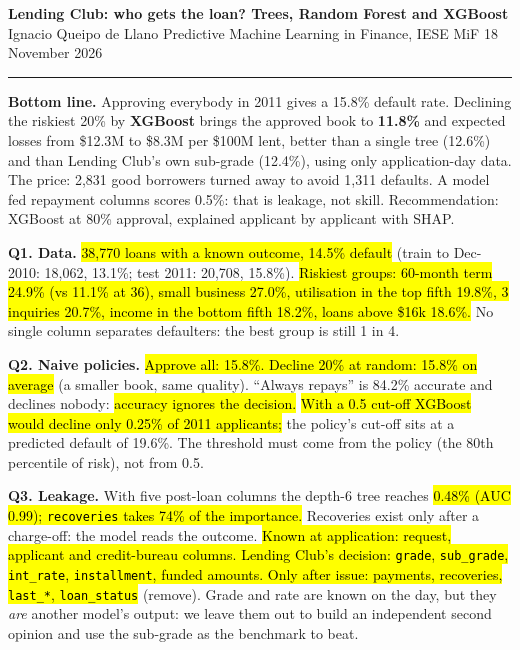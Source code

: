 \documentclass[10pt,a4paper]{article}
\newcommand{\q}[1]{\textbf{\color{blue!50!black}#1}}
\begin{document}
\small

{\large\textbf{Lending Club: who gets the loan? Trees, Random Forest and XGBoost}}\\
Ignacio Queipo de Llano \textperiodcentered{} Predictive Machine Learning in Finance, IESE MiF \textperiodcentered{} 18 November 2026\\[-6pt]
\rule{\linewidth}{0.4pt}

\begin{tcolorbox}[colback=white,colframe=black,boxrule=0.4pt,sharp corners,left=5pt,right=5pt,top=3pt,bottom=3pt]
\textbf{Bottom line.} Approving everybody in 2011 gives a 15.8\% default rate. Declining the riskiest 20\% by
\textbf{XGBoost} brings the approved book to \textbf{11.8\%} and expected losses from \$12.3M to \$8.3M per \$100M lent,
better than a single tree (12.6\%) and than Lending Club's own sub-grade (12.4\%), using only application-day data. The
price: 2,831 good borrowers turned away to avoid 1,311 defaults. A model fed repayment columns scores 0.5\%: that is
leakage, not skill. Recommendation: XGBoost at 80\% approval, explained applicant by applicant with SHAP.
\end{tcolorbox}

\q{Q1. Data.} \hl{38,770 loans with a known outcome, 14.5\% default} (train to Dec-2010: 18,062, 13.1\%; test 2011:
20,708, 15.8\%). \hl{Riskiest groups: 60-month term 24.9\% (vs 11.1\% at 36), small business 27.0\%, utilisation in the top
fifth 19.8\%, 3 inquiries 20.7\%, income in the bottom fifth 18.2\%, loans above \$16k 18.6\%.} No single column separates
defaulters: the best group is still 1 in 4.

\q{Q2. Naive policies.} \hl{Approve all: 15.8\%. Decline 20\% at random: 15.8\% on average} (a smaller book, same
quality). ``Always repays'' is 84.2\% accurate and declines nobody: \hl{accuracy ignores the decision.} \hl{With a 0.5
cut-off XGBoost would decline only 0.25\% of 2011 applicants;} the policy's cut-off sits at a predicted default of
19.6\%. The threshold must come from the policy (the 80th percentile of risk), not from 0.5.

\q{Q3. Leakage.} With five post-loan columns the depth-6 tree reaches \hl{0.48\% (AUC 0.99); \texttt{recoveries} takes
74\% of the importance.} Recoveries exist only after a charge-off: the model reads the outcome. \hl{Known at application:
request, applicant and credit-bureau columns. Lending Club's decision: \texttt{grade}, \texttt{sub\_grade},
\texttt{int\_rate}, \texttt{installment}, funded amounts. Only after issue: payments, recoveries, \texttt{last\_*},
\texttt{loan\_status}} (remove). Grade and rate are known on the day, but they \emph{are} another model's output: we
leave them out to build an independent second opinion and use the sub-grade as the benchmark to beat.
\end{document}
